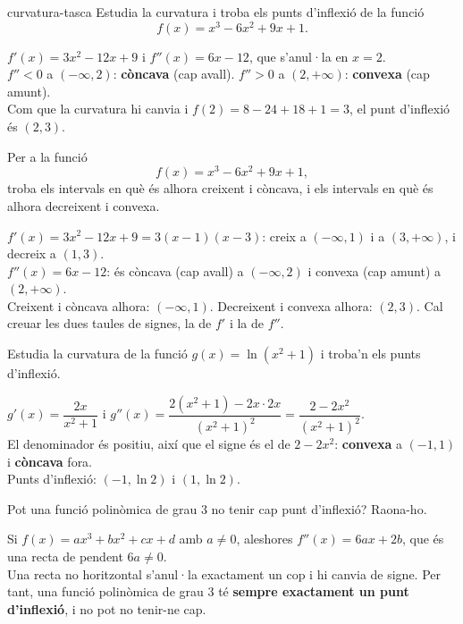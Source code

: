 \begin{apartats}

\begin{tria}{curvatura-tasca}
Estudia la curvatura i troba els punts d'inflexió de la funció
\[
f(x)=x^3-6x^2+9x+1 .
\]

\begin{solucio}
$f'(x)=3x^2-12x+9$ i $f''(x)=6x-12$, que s'anul·la en $x=2$.\\
$f''<0$ a $(-\infty,2)$: \textbf{còncava} (cap avall). \quad $f''>0$ a $(2,+\infty)$:
\textbf{convexa} (cap amunt).\\
Com que la curvatura hi canvia i $f(2)=8-24+18+1=3$, el punt d'inflexió és $\boxed{(2,3)}$.
\end{solucio}

Per a la funció
\[
f(x)=x^3-6x^2+9x+1 ,
\]
troba els intervals en què és alhora creixent i còncava, i els intervals en què és alhora
decreixent i convexa.

\begin{solucio}
$f'(x)=3x^2-12x+9=3(x-1)(x-3)$: creix a $(-\infty,1)$ i a $(3,+\infty)$, i decreix a $(1,3)$.\\
$f''(x)=6x-12$: és còncava (cap avall) a $(-\infty,2)$ i convexa (cap amunt) a $(2,+\infty)$.\\
Creixent i còncava alhora: $(-\infty,1)$. Decreixent i convexa alhora: $(2,3)$. Cal creuar les
dues taules de signes, la de $f'$ i la de $f''$.
\end{solucio}
\end{tria}

\begin{nomesllarg}
Estudia la curvatura de la funció $g(x)=\ln\left(x^2+1\right)$ i troba'n els punts d'inflexió.

\begin{solucio}
$g'(x)=\dfrac{2x}{x^2+1}$ i
$g''(x)=\dfrac{2\left(x^2+1\right)-2x\cdot2x}{\left(x^2+1\right)^2}
=\dfrac{2-2x^2}{\left(x^2+1\right)^2}$.\\
El denominador és positiu, així que el signe és el de $2-2x^2$: \textbf{convexa} a $(-1,1)$ i
\textbf{còncava} fora.\\
Punts d'inflexió: $(-1,\ln2)$ i $(1,\ln2)$.
\end{solucio}
\end{nomesllarg}

Pot una funció polinòmica de grau $3$ no tenir cap punt d'inflexió? Raona-ho.

\begin{solucio}
Si $f(x)=ax^3+bx^2+cx+d$ amb $a\neq0$, aleshores $f''(x)=6ax+2b$, que és una recta de pendent
$6a\neq0$.\\
Una recta no horitzontal s'anul·la exactament un cop i hi canvia de signe. Per tant, una
funció polinòmica de grau $3$ té \textbf{sempre exactament un punt d'inflexió}, i no pot no
tenir-ne cap.
\end{solucio}

\end{apartats}
